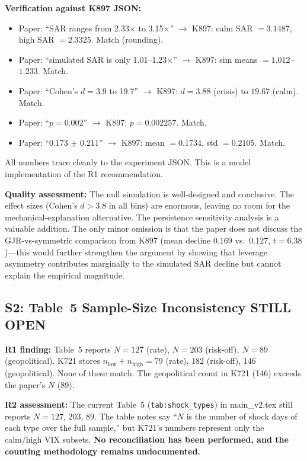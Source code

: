 \documentclass[12pt,a4paper]{article}
\begin{document}
\textbf{Verification against K897 JSON:}
\begin{itemize}[nosep]
\item Paper: ``SAR ranges from 2.33$\times$ to 3.15$\times$'' $\to$ K897: calm SAR $= 3.1487$, high SAR $= 2.3325$. \textcolor{okgreen}{Match} (rounding).
\item Paper: ``simulated SAR is only 1.01--1.23$\times$'' $\to$ K897: sim means $= 1.012$--$1.233$. \textcolor{okgreen}{Match}.
\item Paper: ``Cohen's $d = 3.9$ to 19.7'' $\to$ K897: $d = 3.88$ (crisis) to $19.67$ (calm). \textcolor{okgreen}{Match}.
\item Paper: ``$p = 0.002$'' $\to$ K897: $p = 0.002257$. \textcolor{okgreen}{Match}.
\item Paper: ``0.173 $\pm$ 0.211'' $\to$ K897: mean $= 0.1734$, std $= 0.2105$. \textcolor{okgreen}{Match}.
\end{itemize}

All numbers trace cleanly to the experiment JSON. This is a model implementation of the R1 recommendation.

\textbf{Quality assessment:} The null simulation is well-designed and conclusive. The effect sizes (Cohen's $d > 3.8$ in all bins) are enormous, leaving no room for the mechanical-explanation alternative. The persistence sensitivity analysis is a valuable addition. The only minor omission is that the paper does not discuss the GJR-vs-symmetric comparison from K897 (mean decline 0.169 vs.\ 0.127, $t = 6.38$)---this would further strengthen the argument by showing that leverage asymmetry contributes marginally to the simulated SAR decline but cannot explain the empirical magnitude.


\subsection*{S2: Table~5 Sample-Size Inconsistency \hfill \textcolor{errorred}{STILL OPEN}}

\textbf{R1 finding:} Table~5 reports $N = 127$ (rate), $N = 203$ (risk-off), $N = 89$ (geopolitical). K721 stores $n_{\text{low}} + n_{\text{high}} = 79$ (rate), $182$ (risk-off), $146$ (geopolitical). None of these match. The geopolitical count in K721 (146) exceeds the paper's $N$ (89).

\textbf{R2 assessment:} The current Table~5 (\texttt{tab:shock\_types}) in main\_v2.tex still reports $N = 127$, $203$, $89$. The table notes say ``$N$ is the number of shock days of each type over the full sample,'' but K721's numbers represent only the calm/high VIX subsets. \textbf{No reconciliation has been performed, and the counting methodology remains undocumented.}
\end{document}
